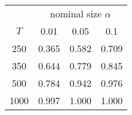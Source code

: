 % 
\begin{tabular}{cccc}
  \hline
  & \multicolumn{3}{c}{nominal size $\alpha$} \\
 $T$ & 0.01 & 0.05 & 0.1 \\
 \hline
250 & 0.365 & 0.582 & 0.709 \\ 
  350 & 0.644 & 0.779 & 0.845 \\ 
  500 & 0.784 & 0.942 & 0.976 \\ 
  1000 & 0.997 & 1.000 & 1.000 \\ 
   \hline
\end{tabular}
